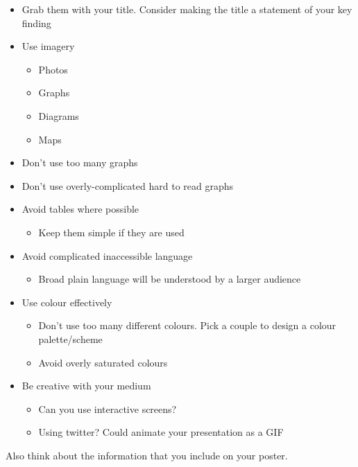 \documentclass[
]{book}
\providecommand{\tightlist}{%
  \setlength{\itemsep}{0pt}\setlength{\parskip}{0pt}}
\begin{document}
\begin{itemize}
\tightlist
\item
  Grab them with your title. Consider making the title a statement of your key finding
\item
  Use imagery

  \begin{itemize}
  \tightlist
  \item
    Photos
  \item
    Graphs
  \item
    Diagrams
  \item
    Maps
  \end{itemize}
\item
  Don't use too many graphs
\item
  Don't use overly-complicated hard to read graphs
\item
  Avoid tables where possible

  \begin{itemize}
  \tightlist
  \item
    Keep them simple if they are used
  \end{itemize}
\item
  Avoid complicated inaccessible language

  \begin{itemize}
  \tightlist
  \item
    Broad plain language will be understood by a larger audience
  \end{itemize}
\item
  Use colour effectively

  \begin{itemize}
  \tightlist
  \item
    Don't use too many different colours. Pick a couple to design a colour palette/scheme
  \item
    Avoid overly saturated colours
  \end{itemize}
\item
  Be creative with your medium

  \begin{itemize}
  \tightlist
  \item
    Can you use interactive screens?
  \item
    Using twitter? Could animate your presentation as a GIF
  \end{itemize}
\end{itemize}

Also think about the information that you include on your poster.
\end{document}
